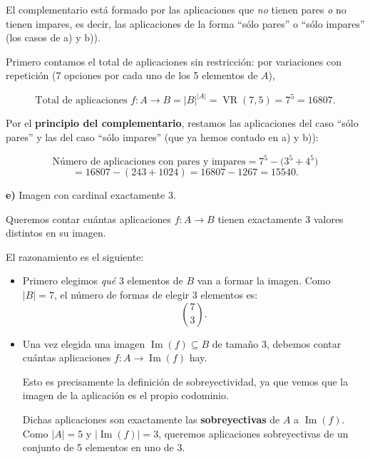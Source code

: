 \documentclass[a4paper,12pt]{article}
\begin{document}
\begin{ejercicio}[title=Ejercicio 20]

El complementario está formado por las aplicaciones que \emph{no} tienen pares \emph{o} no tienen impares, es decir, las aplicaciones de la forma “sólo pares” o “sólo impares” (los casos de a) y b)).

\vspace{0.5em}

Primero contamos el total de aplicaciones sin restricción: por variaciones con repetición (7 opciones por cada uno de los 5 elementos de $A$),

\[
\text{Total de aplicaciones } f: A\to B = |B|^{|A|} = \operatorname{VR}(7,5) = 7^{5} = 16807.
\]

Por el \textbf{principio del complementario}, restamos las aplicaciones del caso “sólo pares” y las del caso “sólo impares” (que ya hemos contado en a) y b)):

\[
\text{Número de aplicaciones con pares y impares}
= 7^{5} - \bigl(3^{5} + 4^{5}\bigr)
\]
\[
= 16807 - (243 + 1024)
= 16807 - 1267
= \boxed{15540}.
\]

\vspace{0.5em}

\textbf{e)} Imagen con cardinal exactamente $3$.

\vspace{0.5em}

Queremos contar cuántas aplicaciones $f : A \to B$ tienen exactamente $3$ valores distintos en su imagen.

El razonamiento es el siguiente:

\begin{itemize}
    \item Primero elegimos \emph{qué} $3$ elementos de $B$ van a formar la imagen.
    Como $|B|=7$, el número de formas de elegir $3$ elementos es:
    \[
    \binom{7}{3}.
    \]

    \item Una vez elegida una imagen $\operatorname{Im}(f)\subseteq B$ de tamaño $3$, debemos contar cuántas aplicaciones $f : A \to \operatorname{Im}(f)$ hay.

    Esto es precisamente la definición de sobreyectividad, ya que vemos que la imagen de la aplicación es el propio codominio.
    
    Dichas aplicaciones son exactamente las \textbf{sobreyectivas} de $A$ a $\operatorname{Im}(f)$.  
    Como $|A|=5$ y $|\operatorname{Im}(f)|=3$, queremos aplicaciones sobreyectivas de un conjunto de 5 elementos en uno de 3.


\end{itemize}
\end{ejercicio}
\end{document}
